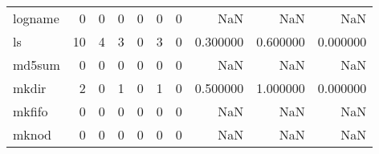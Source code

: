 \begin{tabular}{lrrrrrrrrr}
logname   &                                                  0 &                                                  0 &                                                  0 &                                                  0 &                                                  0 &                                                  0 &                                                NaN &                                    NaN &                                  NaN \\
ls        &                                                 10 &                                                  4 &                                                  3 &                                                  0 &                                                  3 &                                                  0 &                                           0.300000 &                               0.600000 &                             0.000000 \\
md5sum    &                                                  0 &                                                  0 &                                                  0 &                                                  0 &                                                  0 &                                                  0 &                                                NaN &                                    NaN &                                  NaN \\
mkdir     &                                                  2 &                                                  0 &                                                  1 &                                                  0 &                                                  1 &                                                  0 &                                           0.500000 &                               1.000000 &                             0.000000 \\
mkfifo    &                                                  0 &                                                  0 &                                                  0 &                                                  0 &                                                  0 &                                                  0 &                                                NaN &                                    NaN &                                  NaN \\
mknod     &                                                  0 &                                                  0 &                                                  0 &                                                  0 &                                                  0 &                                                  0 &                                                NaN &                                    NaN &                                  NaN \\

\end{tabular}
